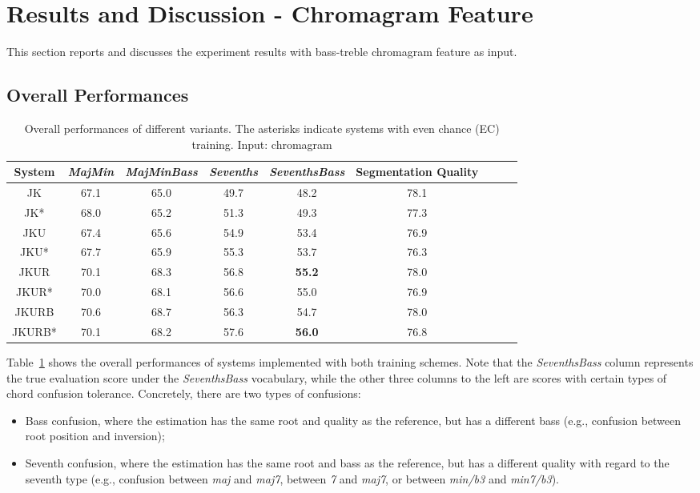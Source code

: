 \section{Results and Discussion - Chromagram Feature}\label{sec:4-ch}
This section reports and discusses the experiment results with bass-treble chromagram feature as input.
\subsection{Overall Performances}

\begin{table}[htb]
	\caption{Overall performances of different variants. The asterisks indicate systems with even chance (EC) training. Input: chromagram}
	\label{tab:4-overallres}
	\centering
	\scriptsize
	\begin{tabular}{|c|c|c|c|c|c|c|c|c|}\hline
		System & \textit{MajMin} & \textit{MajMinBass} & \textit{Sevenths} & \textbf{\textit{SeventhsBass}} & Segmentation Quality  \\ \hline
		JK & 67.1 & 65.0 & 49.7 & 48.2 & 78.1 \\ \hline
		JK* & 68.0 & 65.2 & 51.3 & 49.3 & 77.3 \\ \hline
		JKU & 67.4 & 65.6 & 54.9 & 53.4 & 76.9 \\ \hline
		JKU* & 67.7 & 65.9 & 55.3 & 53.7 & 76.3 \\ \hline
		JKUR & 70.1 & 68.3 & 56.8 & \textbf{55.2} & 78.0 \\ \hline
		JKUR* & 70.0 & 68.1 & 56.6 & 55.0 & 76.9 \\ \hline
		JKURB & 70.6 & 68.7 & 56.3 & 54.7 & 78.0 \\ \hline
		JKURB* & 70.1 & 68.2 & 57.6 & \textbf{56.0} & 76.8 \\ \hline
	\end{tabular}
\end{table}
Table~\ref{tab:4-overallres} shows the overall performances of systems implemented with both training schemes. Note that the \textit{SeventhsBass} column represents the true evaluation score under the \textit{SeventhsBass} vocabulary, while the other three columns to the left are scores with certain types of chord confusion tolerance. Concretely, there are two types of confusions:
\begin{itemize}
	\item Bass confusion, where the estimation has the same root and quality as the reference, but has a different bass (e.g., confusion between root position and inversion);
	\item Seventh confusion, where the estimation has the same root and bass as the reference, but has a different quality with regard to the seventh type (e.g., confusion between \textit{maj} and \textit{maj7}, between \textit{7} and \textit{maj7}, or between \textit{min/b3} and \textit{min7/b3}).
\end{itemize}
